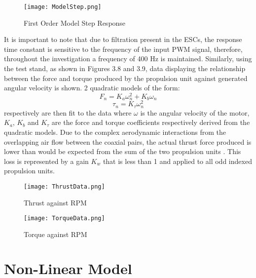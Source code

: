 \documentclass[12pt,a4paper,twoside]{report}
\begin{document}
			\begin{figure}[h!]
				\centering
				\texttt{[image: ModelStep.png]}
				\caption{First Order Model Step Response}
				\label{fig:modelstep}
			\end{figure}
			
			It is important to note that due to filtration present in the ESCs, the response time constant is sensitive to the frequency of the input PWM signal, therefore, throughout the investigation a frequency of 400 Hz is maintained. Similarly, using the test stand, as shown in Figures 3.8 and 3.9, data displaying the relationship between the force and torque produced by the propulsion unit against generated angular velocity is shown. 2 quadratic models of the form: 
			\begin{equation}
				F_n = K_a \omega_n^2 + K_b\omega_n
			\end{equation}
			\begin{equation}
				\tau_n = K_\tau \omega_n^2
			\end{equation}
			respectively are then fit to the data where $\omega$ is the angular velocity of the motor, $K_a$, $K_b$ and $K_\tau$ are the force and torque coefficients respectively derived from the quadratic models. Due to the complex aerodynamic interactions from the overlapping air flow between the coaxial pairs, the actual thrust force produced is lower than would be expected from the sum of the two propulsion units \cite{14}. This loss is represented by a gain $K_w$ that is less than 1 and applied to all odd indexed propulsion units.	
			
			\begin{figure}[h!]
				\centering
				\texttt{[image: ThrustData.png]}
				\caption{Thrust against RPM}
				\label{fig:thrustdata}
			\end{figure}
			
			\begin{figure}[h!]
				\centering
				\texttt{[image: TorqueData.png]}
				\caption{Torque against RPM}
				\label{fig:torquedata}
			\end{figure}
		
		\newpage
			
		\section{Non-Linear Model}
			
\end{document}
